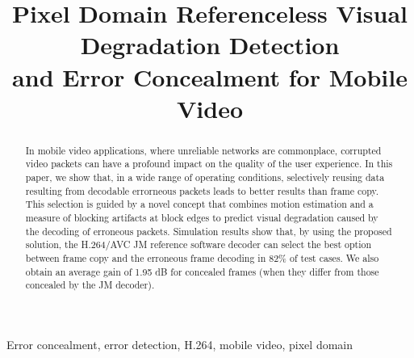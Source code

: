\documentclass{article}
\title{Pixel Domain Referenceless Visual Degradation Detection\\
and Error Concealment for Mobile Video}
\newcommand{\ltCodec}{H.264/AVC JM reference software}
\begin{document}
\renewcommand{\topfraction}{0.9}
\renewcommand{\bottomfraction}{0.5}

\renewcommand{\textfraction}{0.05}
\renewcommand{\floatpagefraction}{0.9}

\setlength{\emergencystretch}{1em}
\frenchspacing

\setlength{\abovedisplayskip}{0.6em plus 0.5em}
\setlength{\belowdisplayskip}{0.6em plus 0.5em}

 \address{Department of Software and IT
Engineering\\ École de technologie supérieure, Université du
Québec\\ Montréal, Québec, Canada}

\maketitle


\begin{spacing}{0.9}
\begin{abstract}
\small In mobile video applications, where unreliable networks are
commonplace, corrupted video packets can have a profound impact on the
quality of the user experience. In this paper, we show that, in a wide
range of operating conditions, selectively reusing data resulting from
decodable errorneous packets leads to better results than frame copy. This
selection is guided by a novel concept that combines motion estimation
and a measure of blocking artifacts at block edges to predict visual
degradation caused by the decoding of erroneous packets. Simulation results
show that, by using the proposed solution, the \ltCodec{} decoder can
select the best option between frame copy and the erroneous frame decoding in
82\% of test cases. We also obtain an average gain of 1.95 dB for concealed 
frames (when they differ from those concealed by the JM decoder).
\end{abstract}

\begin{keywords}
\small Error concealment, error detection, H.264, mobile video, pixel domain
\end{keywords}
\end{spacing}
\end{document}
